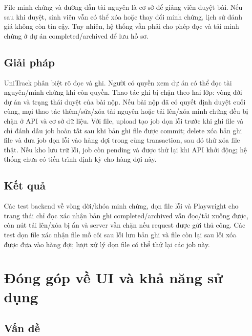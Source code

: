 File minh chứng và đường dẫn tài nguyên là cơ sở để giảng viên duyệt bài. Nếu sau khi duyệt, sinh viên vẫn có thể xóa hoặc thay đổi minh chứng, lịch sử đánh giá không còn tin cậy. Tuy nhiên, hệ thống vẫn phải cho phép đọc và tải minh chứng ở dự án completed/archived để lưu hồ sơ.

\subsection{Giải pháp}

UniTrack phân biệt rõ đọc và ghi. Người có quyền xem dự án có thể đọc tài nguyên/minh chứng khi còn quyền. Thao tác ghi bị chặn theo hai lớp: vòng đời dự án và trạng thái duyệt của bài nộp. Nếu bài nộp đã có quyết định duyệt cuối cùng, mọi thao tác thêm/sửa/xóa tài nguyên hoặc tải lên/xóa minh chứng đều bị chặn ở API và cơ sở dữ liệu. Với file, upload tạo job dọn lỗi trước khi ghi file và chỉ đánh dấu job hoàn tất sau khi bản ghi file được commit; delete xóa bản ghi file và đưa job dọn lỗi vào hàng đợi trong cùng transaction, sau đó thử xóa file thật. Nếu kho lưu trữ lỗi, job còn pending và được thử lại khi API khởi động; hệ thống chưa có tiến trình định kỳ cho hàng đợi này.

\figSupportLifecycle

\subsection{Kết quả}

Các test backend về vòng đời/khóa minh chứng, dọn file lỗi và Playwright cho trạng thái chỉ đọc xác nhận bản ghi completed/archived vẫn đọc/tải xuống được, còn nút tải lên/xóa bị ẩn và server vẫn chặn nếu request được gửi thủ công. Các test dọn file xác nhận file mồ côi sau lỗi lưu bản ghi và file còn lại sau lỗi xóa được đưa vào hàng đợi; lượt xử lý dọn file có thể thử lại các job này.

\section{Đóng góp về UI và khả năng sử dụng}

\subsection{Vấn đề}

